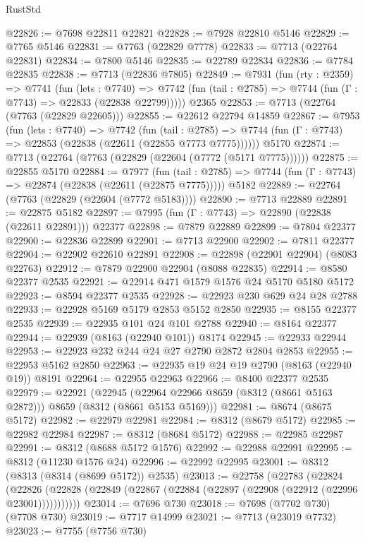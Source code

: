 \begin{lexlean}{RustStd}
\begin{coremodule}
@22826 := @7698 @22811 @22821
@22828 := @7928 @22810 @5146
@22829 := @7765 @5146
@22831 := @7763 (@22829 @7778)
@22833 := @7713 (@22764 @22831)
@22834 := @7800 @5146
@22835 := @22789 @22834
@22836 := @7784 @22835
@22838 := @7713 (@22836 @7805)
@22849 := @7931
    (fun (rty : @2359) =>
    @7741
      (fun (lets : @7740) =>
      @7742 (fun (tail : @2785) => @7744 (fun (Γ : @7743) => @22833 (@22838 @22799)))))
    @2365
@22853 := @7713 (@22764 (@7763 (@22829 @22605)))
@22855 := @22612 @22794 @14859
@22867 := @7953
    (fun (lets : @7740) =>
    @7742
      (fun (tail : @2785) =>
      @7744 (fun (Γ : @7743) => @22853 (@22838 (@22611 (@22855 @7773 @7775))))))
    @5170
@22874 := @7713 (@22764 (@7763 (@22829 (@22604 (@7772 (@5171 @7775))))))
@22875 := @22855 @5170
@22884 := @7977
    (fun (tail : @2785) => @7744 (fun (Γ : @7743) => @22874 (@22838 (@22611 (@22875 @7775)))))
    @5182
@22889 := @22764 (@7763 (@22829 (@22604 (@7772 @5183))))
@22890 := @7713 @22889
@22891 := @22875 @5182
@22897 := @7995 (fun (Γ : @7743) => @22890 (@22838 (@22611 @22891))) @22377
@22898 := @7879 @22889
@22899 := @7804 @22377
@22900 := @22836 @22899
@22901 := @7713 @22900
@22902 := @7811 @22377
@22904 := @22902 @22610 @22891
@22908 := @22898 (@22901 @22904) (@8083 @22763)
@22912 := @7879 @22900 @22904 (@8088 @22835)
@22914 := @8580 @22377 @2535
@22921 := @22914 @471 @1579 @1576 @24 @5170 @5180 @5172
@22923 := @8594 @22377 @2535
@22928 := @22923 @230 @629 @24 @28 @2788
@22933 := @22928 @5169 @5179 @2853 @5152 @2850
@22935 := @8155 @22377 @2535
@22939 := @22935 @101 @24 @101 @2788
@22940 := @8164 @22377
@22944 := @22939 (@8163 (@22940 @101)) @8174
@22945 := @22933 @22944
@22953 := @22923 @232 @244 @24 @27 @2790 @2872 @2804 @2853
@22955 := @22953 @5162 @2850
@22963 := @22935 @19 @24 @19 @2790 (@8163 (@22940 @19)) @8191
@22964 := @22955 @22963
@22966 := @8400 @22377 @2535
@22979 := @22921
    (@22945 (@22964 @22966 @8659 (@8312 (@8661 @5163 @2872))) @8659 (@8312 (@8661 @5153 @5169)))
@22981 := @8674 (@8675 @5172)
@22982 := @22979 @22981
@22984 := @8312 (@8679 @5172)
@22985 := @22982 @22984
@22987 := @8312 (@8684 @5172)
@22988 := @22985 @22987
@22991 := @8312 (@8688 @5172 @1576)
@22992 := @22988 @22991
@22995 := @8312 (@11230 @1576 @24)
@22996 := @22992 @22995
@23001 := @8312 (@8313 (@8314 (@8699 @5172)) @2535)
@23013 := @22758
    (@22783
      (@22824
        (@22826 (@22828 (@22849 (@22867 (@22884 (@22897 (@22908 (@22912 (@22996 @23001)))))))))))
@23014 := @7696 @730
@23018 := @7698 (@7702 @730) (@7708 @730)
@23019 := @7717 @14999
@23021 := @7713 (@23019 @7732)
@23023 := @7755 (@7756 @730)

\end{coremodule}
\end{lexlean}

